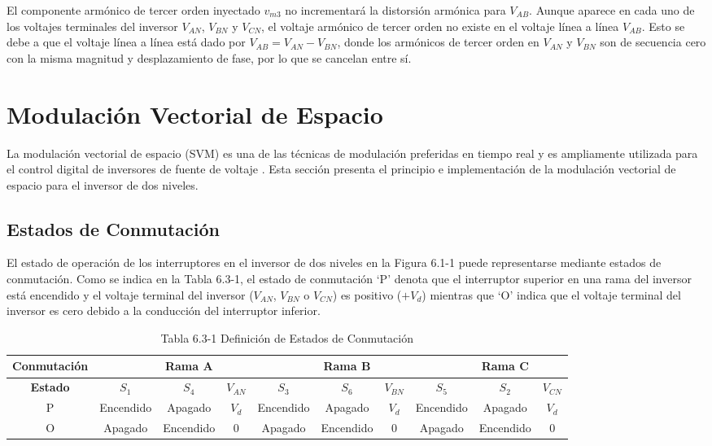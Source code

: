\documentclass[letterpaper,12pt]{article}
\begin{document}
El componente armónico de tercer orden inyectado $v_{m3}$ no incrementará la distorsión armónica para $V_{AB}$. Aunque aparece en cada uno de los voltajes terminales del inversor $V_{AN}$, $V_{BN}$ y $V_{CN}$, el voltaje armónico de tercer orden no existe en el voltaje línea a línea $V_{AB}$. Esto se debe a que el voltaje línea a línea está dado por $V_{AB} = V_{AN} - V_{BN}$, donde los armónicos de tercer orden en $V_{AN}$ y $V_{BN}$ son de secuencia cero con la misma magnitud y desplazamiento de fase, por lo que se cancelan entre sí.

\section{Modulación Vectorial de Espacio}
La modulación vectorial de espacio (SVM) es una de las técnicas de modulación preferidas en tiempo real y es ampliamente utilizada para el control digital de inversores de fuente de voltaje \cite{ref3, ref4}. Esta sección presenta el principio e implementación de la modulación vectorial de espacio para el inversor de dos niveles.

\subsection{Estados de Conmutación}
El estado de operación de los interruptores en el inversor de dos niveles en la Figura 6.1-1 puede representarse mediante estados de conmutación. Como se indica en la Tabla 6.3-1, el estado de conmutación `P' denota que el interruptor superior en una rama del inversor está encendido y el voltaje terminal del inversor ($V_{AN}$, $V_{BN}$ o $V_{CN}$) es positivo ($+V_d$) mientras que `O' indica que el voltaje terminal del inversor es cero debido a la conducción del interruptor inferior.

\begin{table}[h]
    \centering
    \caption{Tabla 6.3-1 Definición de Estados de Conmutación}
    \begin{tabular}{c c c c c c c c c c}
        \hline
        \textbf{Conmutación} & & \textbf{Rama A} & & & \textbf{Rama B} & & & \textbf{Rama C} & \\
        \hline
        \textbf{Estado} & $S_1$ & $S_4$ & $V_{AN}$ & $S_3$ & $S_6$ & $V_{BN}$ & $S_5$ & $S_2$ & $V_{CN}$ \\
        \hline
        P & Encendido & Apagado & $V_d$ &  Encendido & Apagado & $V_d$ & Encendido & Apagado & $V_d$ \\
        O & Apagado & Encendido & 0 & Apagado & Encendido & 0 & Apagado & Encendido & 0 \\
        \hline
    \end{tabular}
    \label{tabla:estados_conmutacion}
\end{table}
\FloatBarrier
\end{document}
